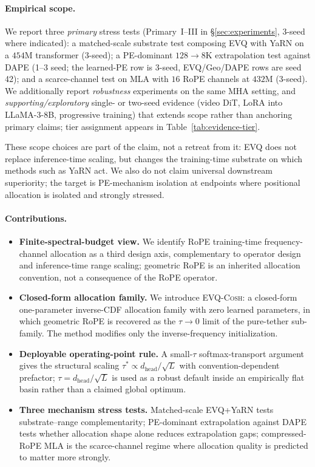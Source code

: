 \paragraph{Empirical scope.} We report three \emph{primary} stress tests (Primary~I--III in \S\ref{sec:experiments}, 3-seed where indicated): a matched-scale substrate test composing EVQ with YaRN on a $454$M transformer (3-seed); a PE-dominant $128{\to}8\mathrm{K}$ extrapolation test against DAPE \citep{zheng2024dape} (1--3 seed; the learned-PE row is 3-seed, EVQ/Geo/DAPE rows are seed 42); and a scarce-channel test on MLA \citep{deepseekv2, deepseekv3} with $16$ RoPE channels at $432$M (3-seed). We additionally report \emph{robustness} experiments on the same MHA setting, and \emph{supporting/exploratory} single- or two-seed evidence (video DiT, LoRA into LLaMA-3-8B, progressive training) that extends scope rather than anchoring primary claims; tier assignment appears in Table~\ref{tab:evidence-tier}.

These scope choices are part of the claim, not a retreat from it: EVQ does not replace inference-time scaling, but changes the training-time substrate on which methods such as YaRN act. We also do not claim universal downstream superiority; the target is PE-mechanism isolation at endpoints where positional allocation is isolated and strongly stressed.

\paragraph{Contributions.}
\begin{itemize}
\item \textbf{Finite-spectral-budget view.} We identify RoPE training-time frequency-channel allocation as a third design axis, complementary to operator design and inference-time range scaling; geometric RoPE is an inherited allocation convention, not a consequence of the RoPE operator.
\item \textbf{Closed-form allocation family.} We introduce \textsc{EVQ-Cosh}: a closed-form one-parameter inverse-CDF allocation family with zero learned parameters, in which geometric RoPE is recovered as the $\tau{\to}0$ limit of the pure-tether sub-family. The method modifies only the inverse-frequency initialization.
\item \textbf{Deployable operating-point rule.} A small-$\tau$ softmax-transport argument gives the structural scaling $\tau^{*}\propto d_{\mathrm{head}}/\sqrt{L}$ with convention-dependent prefactor; $\tau{=}d_{\mathrm{head}}/\sqrt{L}$ is used as a robust default inside an empirically flat basin rather than a claimed global optimum.
\item \textbf{Three mechanism stress tests.} Matched-scale EVQ+YaRN tests substrate--range complementarity; PE-dominant extrapolation against DAPE tests whether allocation shape alone reduces extrapolation gaps; compressed-RoPE MLA is the scarce-channel regime where allocation quality is predicted to matter more strongly.
\end{itemize}
